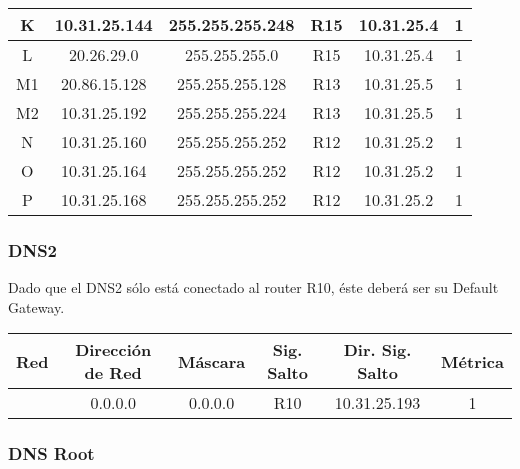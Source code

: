 \begin{tabular}{|c|c|c|c|c|c|}
 	\hline
	K & 10.31.25.144 & 255.255.255.248 & R15 & 10.31.25.4 & 1\\
 	\hline
	L & 20.26.29.0 & 255.255.255.0 & R15 & 10.31.25.4 & 1\\
	\hline
	M1 & 20.86.15.128 & 255.255.255.128 & R13 & 10.31.25.5 & 1\\
	\hline
	M2 & 10.31.25.192 & 255.255.255.224 & R13 & 10.31.25.5 & 1\\
	\hline
	N & 10.31.25.160 & 255.255.255.252 & R12 & 10.31.25.2 & 1\\
	\hline
	O & 10.31.25.164 & 255.255.255.252 & R12 & 10.31.25.2 & 1\\
	\hline
	P & 10.31.25.168 & 255.255.255.252 & R12 & 10.31.25.2 & 1\\
	\hline
\end{tabular}

\subsubsection{DNS2}
Dado que el DNS2 sólo está conectado al router R10, éste deberá ser su Default Gateway.
\begin{tabular}{|c|c|c|c|c|c|}
	\hline
	Red & Dirección de Red & Máscara & Sig. Salto & Dir. Sig. Salto & Métrica \\
	\hline
	& 0.0.0.0 & 0.0.0.0 & R10 & 10.31.25.193 & 1\\
	\hline
\end{tabular}

\subsubsection{DNS Root}

